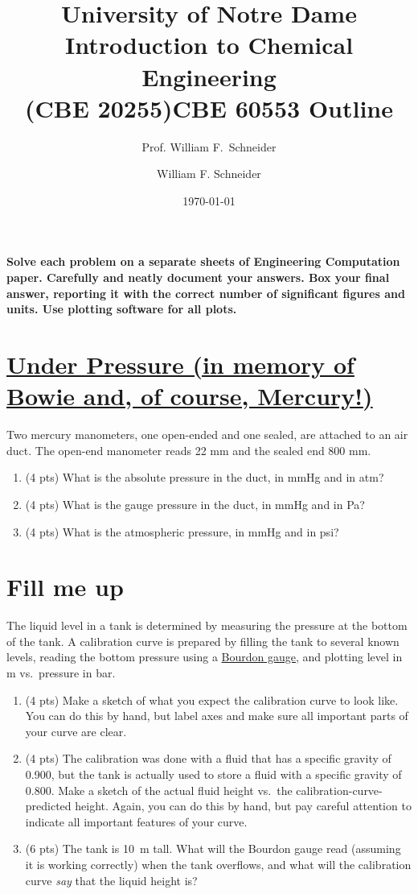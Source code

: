 \documentclass[11pt]{article}
\title{University of Notre Dame\\Introduction to Chemical Engineering\\(CBE 20255)}
\author{Prof. William F.\ Schneider}
\author{William F. Schneider}
\date{\today}
\title{CBE 60553 Outline}
\begin{document}
\begin{options}
\end{options}

\noindent \textbf{Solve each problem on a separate sheets of Engineering Computation paper.  Carefully and neatly document your answers. Box your final answer, reporting it with the correct number of significant figures and units.  Use plotting software for all plots.}


\section{\href{https://www.youtube.com/watch?v=YoDh_gHDvkk}{Under Pressure (in memory of Bowie and, of course, Mercury!)}}
\label{sec-1}
Two mercury manometers, one open-ended and one sealed, are attached to an air duct.  The open-end manometer reads 22 mm and the sealed end 800 mm.

\begin{enumerate}
\item (4 pts) What is the absolute pressure in the duct, in mmHg and in atm?

\item (4 pts) What is the gauge pressure in the duct, in mmHg and in Pa?

\item (4 pts) What is the atmospheric pressure, in mmHg and in psi?
\end{enumerate}

\section{Fill me up}
\label{sec-2}
The liquid level in a tank is determined by measuring the pressure at the bottom of the tank.  A calibration curve is prepared by filling the tank to several known levels, reading the bottom pressure using a \href{https://en.wikipedia.org/wiki/Pressure_measurement#Bourdon}{Bourdon gauge}, and plotting level in m vs.~pressure in bar.

\begin{enumerate}
\item (4 pts) Make a sketch of what you expect the calibration curve to look like.  You can do this by hand, but label axes and make sure all important parts of your curve are clear.

\item (4 pts) The calibration was done with a fluid that has a specific gravity of 0.900, but the tank is actually used to store a fluid with a specific gravity of 0.800.  Make a sketch of the actual fluid height vs.~the calibration-curve-predicted height.  Again, you can do this by hand, but pay careful attention to indicate all important features of your curve.

\item (6 pts) The tank is \SI{10}{\meter} tall. What will the Bourdon gauge read (assuming it is working correctly) when the tank overflows, and what will the calibration curve \emph{say} that the liquid height is?
\end{enumerate}
\end{document}
